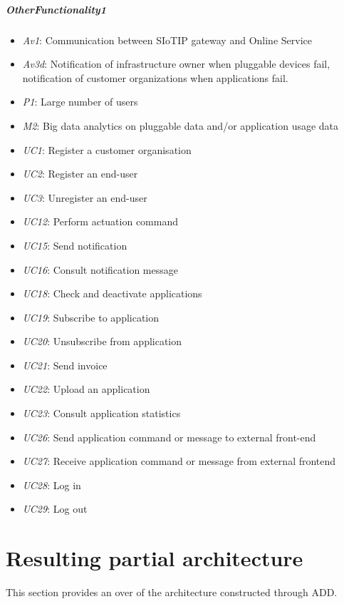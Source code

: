 \documentclass[english]{sareport}
\begin{document}
\paragraph{OtherFunctionality1}
\begin{itemize}
	\item \emph{Av1}: Communication between SIoTIP gateway and Online Service
	\item \emph{Av3d}: Notification of infrastructure owner when pluggable devices fail, notification of customer organizations when applications fail.
	\item \emph{P1}: Large number of users
	\item \emph{M2}: Big data analytics on pluggable data and/or application usage data
	\item \emph{UC1}: Register a customer organisation
	\item \emph{UC2}: Register an end-user
	\item \emph{UC3}: Unregister an end-user
	\item \emph{UC12}: Perform actuation command
	\item \emph{UC15}: Send notification
	\item \emph{UC16}: Consult notification message
	\item \emph{UC18}: Check and deactivate applications
	\item \emph{UC19}: Subscribe to application
	\item \emph{UC20}: Unsubscribe from application
	\item \emph{UC21}: Send invoice
	\item \emph{UC22}: Upload an application
	\item \emph{UC23}: Consult application statistics
	\item \emph{UC26}: Send application command or message to external front-end
	\item \emph{UC27}: Receive application command or message from external frontend
	\item \emph{UC28}: Log in
	\item \emph{UC29}: Log out
\end{itemize}


\chapter{Resulting partial architecture}\label{sec:architecture}
This section provides an over of the architecture constructed through ADD\@.
\end{document}
